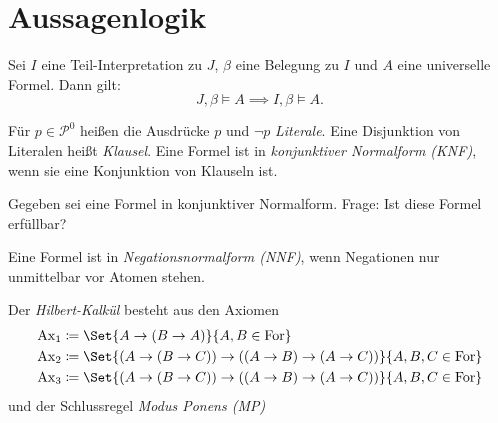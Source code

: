 \documentclass{cheat-sheet}
\newcommand{\For}{\mathrm{For}}
\newcommand{\Ax}{\mathrm{Ax}}
\begin{document}

\section{Aussagenlogik}



\begin{prop}
  Sei $I$ eine Teil-Interpretation zu $J$, $\beta$ eine Belegung zu $I$ und $A$ eine universelle Formel. Dann gilt:
  \[ J, \beta \models A \implies I, \beta \models A. \]
\end{prop}


\begin{defn}
  Für $p \in \mathcal{P}^0$ heißen die Ausdrücke $p$ und $\neg p$ \emph{Literale}. Eine Disjunktion von Literalen heißt \emph{Klausel}. Eine Formel ist in \emph{konjunktiver Normalform (KNF)}, wenn sie eine Konjunktion von Klauseln ist.
\end{defn}


\begin{prob}
  Gegeben sei eine Formel in konjunktiver Normalform. Frage: Ist diese Formel erfüllbar?
\end{prob}

\begin{defn}
  Eine Formel ist in \emph{Negationsnormalform (NNF)}, wenn Negationen nur unmittelbar vor Atomen stehen.
\end{defn}




\begin{defn}
  Der \emph{Hilbert-Kalkül} besteht aus den Axiomen
  \begin{align*}
    \Ax_1 &\coloneqq \Set{ A \to (B \to A) }{ A, B \in \For }\\
    \Ax_2 &\coloneqq \Set{ (A \to (B \to C)) \to ((A \to B) \to (A \to C)) }{ A, B, C \in \For }\\
    \Ax_3 &\coloneqq \Set{ (A \to (B \to C)) \to ((A \to B) \to (A \to C)) }{ A, B, C \in \For }
  \end{align*}
  und der Schlussregel \emph{Modus Ponens (MP)}
  \begin{prooftree}
  \end{prooftree}
\end{defn}
\end{document}

